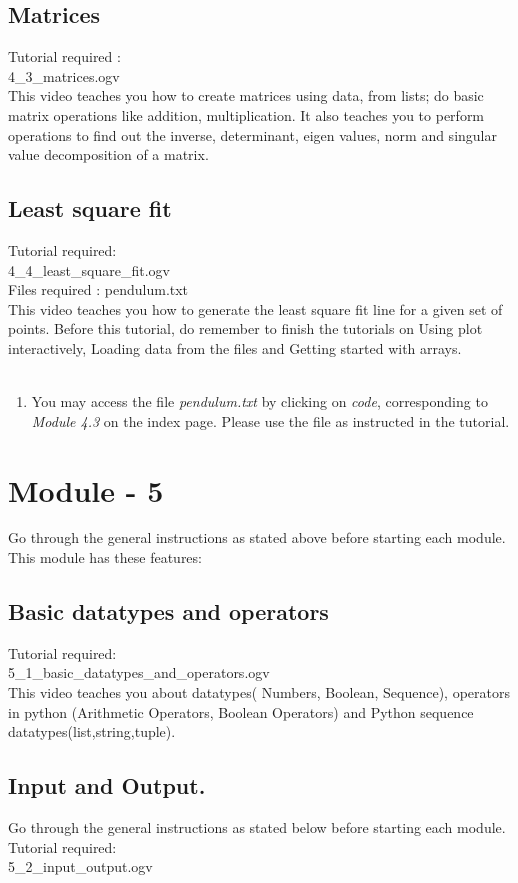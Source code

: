 \documentclass[11pt,twocolumn]{article}
\newenvironment{enumcpt}{\begin{enumerate} \topsep 0pt \partopsep 0pt 
                        \parsep 0pt
                        \itemsep 0pt \leftmargin -1in \rightmargin 0pt
                        }{\end{enumerate}}
\begin{document}
\subsection{Matrices}

Tutorial required : \\ 4\_3\_matrices.ogv \\
This video teaches you how to create matrices using data, from lists; do basic matrix operations like addition, multiplication. It also teaches you to perform operations to find out the inverse, determinant, eigen values, norm and singular value decomposition of a matrix.
\subsection{Least square fit}
Tutorial required: \\ 4\_4\_least\_square\_fit.ogv \\
Files required : pendulum.txt \\
This video teaches you how to generate the least square fit line for a given set of points. Before this tutorial, do remember to finish the tutorials on Using plot interactively, Loading data from the files and Getting started with arrays. \\ \\
\begin{enumcpt}
\item You may access the file \emph{pendulum.txt}  by clicking on \emph{code}, corresponding to \emph{Module 4.3} on the index page. Please use the file as instructed in the tutorial. 
\end{enumcpt}

\section{Module - 5}
Go through the general instructions as stated above before starting each module.
This module has these features:
\subsection{Basic datatypes and operators}
Tutorial required: \\ 5\_1\_basic\_datatypes\_and\_operators.ogv \\
This video teaches you about datatypes( Numbers, Boolean, Sequence), operators in python (Arithmetic Operators, Boolean Operators) and Python sequence datatypes(list,string,tuple).

\subsection{Input and Output.}
Go through the general instructions as stated below before starting each module.
Tutorial required: \\ 5\_2\_input\_output.ogv \\
\end{document}
